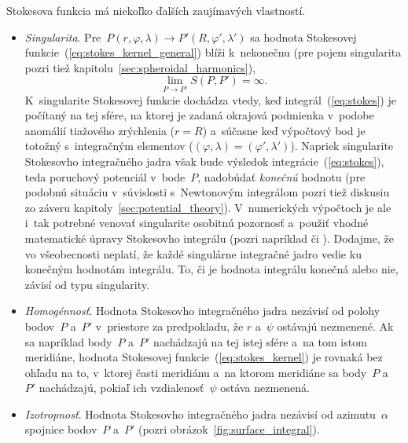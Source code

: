 \documentclass[a4paper, 12pt]{book}
\begin{document}
\pagebreak[2]
Stokesova funkcia má niekoľko ďalších zaujímavých vlastností.
%
\begin{itemize}
\item \emph{Singularita}.  Pre~$P(r, \varphi, \lambda) \rightarrow P'(R, 
\varphi', \lambda')$ sa hodnota Stokesovej 
funkcie~(\ref{eq:stokes_kernel_general}) blíži k~nekonečnu (pre pojem 
singularita pozri tiež kapitolu~\ref{sec:spheroidal_harmonics}),
%
\begin{equation}
\label{eq:stokes_singularity}
\lim\limits_{P \rightarrow P'} S(P, P') = \infty{.}
\end{equation}
%
K~singularite Stokesovej funkcie dochádza vtedy, keď integrál~(\ref{eq:stokes}) 
je počítaný na tej sfére, na ktorej je zadaná okrajová podmienka v~podobe 
anomálií tiažového zrýchlenia ($r = R$) a~súčasne keď výpočtový bod je totožný 
s~integračným elementov ($(\varphi, \lambda) = (\varphi', \lambda')$).  Napriek 
singularite Stokesovho integračného jadra však bude výsledok 
integrácie~(\ref{eq:stokes}), teda poruchový potenciál v~bode~$P$, nadobúdať 
\emph{konečnú} hodnotu (pre podobnú situáciu v~súvislosti s~Newtonovým 
integrálom pozri tiež diskusiu zo záveru kapitoly~\ref{sec:potential_theory}).  
V~numerických výpočtoch je ale i~tak potrebné venovať singularite osobitnú 
pozornosť a~použiť vhodné matematické úpravy Stokesovho integrálu (pozri 
napríklad \cite{MoritzPhysicalGeodesy} či \cite{Hees1991}).  Dodajme, že vo 
všeobecnosti neplatí, že každé singulárne integračné jadro vedie ku konečným 
hodnotám integrálu.  To, či je hodnota integrálu konečná alebo nie, závisí od 
typu singularity.
%
\item \emph{Homogénnosť}.  Hodnota Stokesovho integračného jadra nezávisí od 
polohy bodov~$P$ a~$P'$ v~priestore za predpokladu, že $r$ a~$\psi$ ostávajú 
nezmenené.  Ak sa napríklad body~$P$ a~$P'$ nachádzajú na tej istej sfére a~na 
tom istom meridiáne, hodnota Stokesovej funkcie~(\ref{eq:stokes_kernel}) je 
rovnaká bez ohľadu na to, v~ktorej časti meridiánu a~na ktorom meridiáne sa 
body~$P$ a~$P'$ nachádzajú, pokiaľ ich vzdialenosť~$\psi$ ostáva nezmenená.
%
\item \emph{Izotropnosť}.  Hodnota Stokesovho integračného jadra nezávisí od 
azimutu~$\alpha$ spojnice bodov~$P$ a~$P'$ (pozri 
obrázok~\ref{fig:surface_integral}).
\end{itemize}
\end{document}
